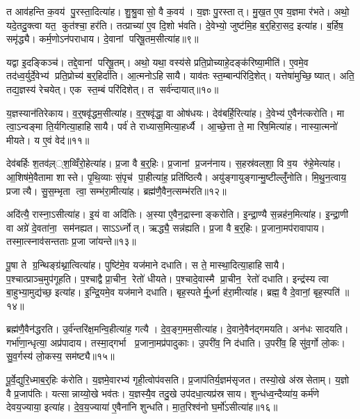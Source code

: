 त आव॑हन्ति क॒वय॑ पु॒रस्ता॒दित्या॑ह। शु॒श्रु॒वासो॒ वै क॒वय॑। य॒ज्ञः पु॒रस्तात्। मु॒ख॒त ए॒व य॒ज्ञमा र॑भते। अथो॒ यदे॒तदु॒क्त्वा यत॒ कुत॑श्चा॒ हर॑ति। तत्प्राच्या॑ ए॒व दि॒शो भ॑वति। दे॒वेभ्यो॒ जुष्ट॑मि॒ह ब॒र्॒हिरा॒सद॒ इत्या॑ह। ब॒र्\mbox{}हिष॒ समृ॑द्ध्यै। कर्म॒णोऽन॑पराधाय। दे॒वानां परिषू॒तम॒सीत्या॑ह॥९॥

यद्वा इ॒दङ्किञ्च॑। तद्दे॒वानां परिषू॒तम्। अथो॒ यथा॒ वस्य॑से प्रति॒प्रोच्याहे॒दङ्क॑रिष्या॒मीति॑। ए॒वमे॒व तद॑ध्व॒र्युर्दे॒वेभ्य॑ प्रति॒प्रोच्य॑ ब॒र्॒हिर्दा॑ति। आ॒त्मनोऽहिसायै। याव॑तः स्त॒म्बान्प॑रिदि॒शेत्। यत्तेषा॑मुच्छि॒ष्यात्। अति॒ तद्य॒ज्ञस्य॑ रेचयेत्। एक स्त॒म्बं परि॑दिशेत्। त सर्व॑न्दायात्॥१०॥

य॒ज्ञस्यान॑तिरेकाय। व॒र्॒षवृ॑द्धम॒सीत्या॑ह। व॒र्॒षवृ॑द्धा॒ वा ओष॑धयः। देव॑बर्\mbox{}हि॒रित्या॑ह। दे॒वेभ्य॑ ए॒वैन॑त्करोति। मा त्वा॒ऽन्वङ्मा ति॒र्यगित्या॒हाहिसायै। पर्व॑ ते राध्यास॒मित्या॒हर्ध्यै। आ॒च्छे॒त्ता ते॒ मा रि॑ष॒मित्या॑ह। नास्या॒त्मनो॑ मीयते। य ए॒वं वेद॑॥११॥

देव॑बर्\mbox{}हिः श॒तव॑ल़््श॒व्विँरो॒हेत्या॑ह। प्र॒जा वै ब॒र्॒हिः। प्र॒जानां प्र॒जन॑नाय। स॒हस्र॑वल्‌शा॒ वि व॒य रु॑हे॒मेत्या॑ह। आ॒शिष॑मे॒वैतामा शास्ते। पृ॒थि॒व्याः सं॒पृच॑ पा॒हीत्या॑ह॒ प्रति॑ष्ठित्यै। अयु॑ङ्गायुङ्गान्मु॒ष्टील्लुँ॑नोति। मि॒थु॒न॒त्वाय॒ प्रजात्यै। सु॒स॒म्भृता त्वा॒ सम्भ॑रा॒मीत्या॑ह। ब्रह्म॑णै॒वैन॒त्सम्भ॑रति॥१२॥

अदि॑त्यै॒ रास्ना॒ऽसीत्या॑ह। इ॒यं वा अदि॑तिः। अ॒स्या ए॒वैन॒द्रास्नाङ्करोति। इ॒न्द्रा॒ण्यै स॒न्नह॑न॒मित्या॑ह। इ॒न्द्रा॒णी वा अग्रे॑ दे॒वता॑ना॒ सम॑नह्यत। साऽऽर्ध्नोत्। ऋद्ध्यै॒ सन्न॑ह्यति। प्र॒जा वै ब॒र्॒हिः। प्र॒जाना॒मप॑रावापाय। तस्मा॒त्स्नाव॑सन्तताः प्र॒जा जा॑यन्ते॥१३॥

पू॒षा ते ग्र॒न्थिङ्ग्र॑थ्ना॒त्वित्या॑ह। पुष्टि॑मे॒व यज॑माने दधाति। स ते॒ मास्था॒दित्या॒हाहिसायै। प॒श्चात्प्राञ्च॒मुप॑गूहति। प॒श्चाद्वै प्रा॒चीन॒ रेतो॑ धीयते। प॒श्चादे॒वास्मै प्रा॒चीन॒ रेतो॑ दधाति। इन्द्र॑स्य त्वा बा॒हुभ्या॒मुद्य॑च्छ॒ इत्या॑ह। इ॒न्द्रि॒यमे॒व यज॑माने दधाति। बृह॒स्पतेर्मू॒र्ध्ना ह॑रा॒मीत्या॑ह। ब्रह्म॒ वै दे॒वानां॒ बृह॒स्पति॑॥१४॥

ब्रह्म॑णै॒वैन॑द्धरति। उ॒र्व॑न्तरि॑क्ष॒मन्वि॒हीत्या॑ह॒ गत्यै। दे॒व॒ङ्ग॒मम॒सीत्या॑ह। दे॒वाने॒वैन॑द्गमयति। अन॑धः सादयति। गर्भा॑णा॒न्धृत्या॒ अप्र॑पादाय। तस्मा॒द्गर्भा प्र॒जाना॒मप्र॑पादुकाः। उ॒परी॑व॒ नि द॑धाति। उ॒परी॑व॒ हि सु॑व॒र्गो लो॒कः। सु॒व॒र्गस्य॑ लो॒कस्य॒ सम॑ष्ट्यै॥१५॥\anuvakamend[स॒यो॒नि॒त्वाय॑ स्व॒धाकृ॑ता॒ऽसीत्या॑ह दाया॒द्वेद॑ भरति जायन्ते॒ बृह॒स्पति॒ सम॑ष्ट्यै]

पू॒र्वे॒द्युरि॒ध्माब॒र्॒हिः क॑रोति। य॒ज्ञमे॒वारभ्य॑ गृही॒त्वोप॑वसति। प्र॒जाप॑तिर्य॒ज्ञम॑सृजत। तस्यो॒खे अ॑स्रसेताम्। य॒ज्ञो वै प्र॒जाप॑तिः। यत्सान्नाय्यो॒खे भव॑तः। य॒ज्ञस्यै॒व तदु॒खे उप॑दधा॒त्यप्र॑स्रसाय। शुन्ध॑ध्व॒न्दैव्या॑य॒ कर्म॑णे देवय॒ज्याया॒ इत्या॑ह। दे॒व॒य॒ज्याया॑ ए॒वैना॑नि शुन्धति। मा॒त॒रिश्व॑नो घ॒र्मो॑ऽसीत्या॑ह॥१६॥

